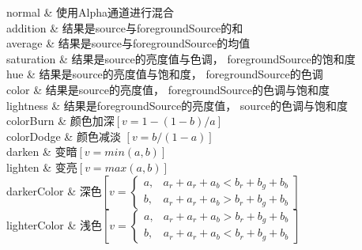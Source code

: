 ﻿




normal
    &
使用Alpha通道进行混合   
    \\

addition
    &
结果是source与foregroundSource的和
    \\

average
    &
结果是source与foregroundSource的均值
    \\

saturation
    &
结果是source的亮度值与色调，
foregroundSource的饱和度
    \\

hue
    &
结果是source的亮度值与饱和度，
foregroundSource的色调
    \\

color
    &
结果是source的亮度值，
foregroundSource的色调与饱和度
    \\

lightness
    &
结果是foregroundSource的亮度值，
source的色调与饱和度
    \\

colorBurn
    &
颜色加深$\left[v=1-(1-b)/a\right]$
    \\

colorDodge
    &
颜色减淡 $\left[v=b/(1-a)\right]$
    \\

darken
    &
变暗$\left[v=min(a,b)\right]$
    \\

lighten
    &
变亮$\left[v=max(a,b)\right]$
    \\

darkerColor
    &
深色$\left[v=\begin{cases}
a, & a_r+a_r+a_b<b_r+b_g+b_b \\ 
b, & a_r+a_r+a_b>b_r+b_g+b_b
\end{cases}\right]$
    \\

lighterColor
    &
浅色$\left[v=\begin{cases}
a, & a_r+a_r+a_b>b_r+b_g+b_b \\ 
b, & a_r+a_r+a_b<b_r+b_g+b_b
\end{cases}\right]$
    \\

